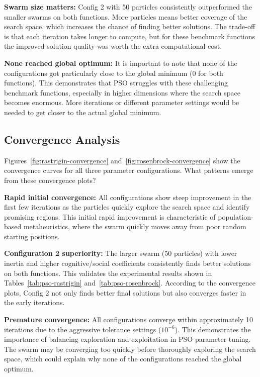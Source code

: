 \documentclass[letterpaper]{article}
\begin{document}
\textbf{Swarm size matters:} Config 2 with 50 particles consistently outperformed the smaller swarms on both functions. More particles means better coverage of the search space, which increases the chance of finding better solutions. The trade-off is that each iteration takes longer to compute, but for these benchmark functions the improved solution quality was worth the extra computational cost.

\textbf{None reached global optimum:} It is important to note that none of the configurations got particularly close to the global minimum (0 for both functions). This demonstrates that PSO struggles with these challenging benchmark functions, especially in higher dimensions where the search space becomes enormous. More iterations or different parameter settings would be needed to get closer to the actual global minimum.

\subsection{Convergence Analysis}

Figures~\ref{fig:rastrigin-convergence} and~\ref{fig:rosenbrock-convergence} show the convergence curves for all three parameter configurations. What patterns emerge from these convergence plots?

\textbf{Rapid initial convergence:} All configurations show steep improvement in the first few iterations as the particles quickly explore the search space and identify promising regions. This initial rapid improvement is characteristic of population-based metaheuristics, where the swarm quickly moves away from poor random starting positions.

\textbf{Configuration 2 superiority:} The larger swarm (50 particles) with lower inertia and higher cognitive/social coefficients consistently finds better solutions on both functions. This validates the experimental results shown in Tables~\ref{tab:pso-rastrigin} and~\ref{tab:pso-rosenbrock}. According to the convergence plots, Config 2 not only finds better final solutions but also converges faster in the early iterations.

\textbf{Premature convergence:} All configurations converge within approximately 10 iterations due to the aggressive tolerance settings ($10^{-6}$). This demonstrates the importance of balancing exploration and exploitation in PSO parameter tuning. The swarm may be converging too quickly before thoroughly exploring the search space, which could explain why none of the configurations reached the global optimum.
\end{document}
